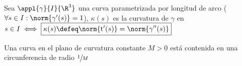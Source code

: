 \documentclass[12pt]{article}
\newcommand{\tngnt}{\operatorname{t}}
\begin{document}
\begin{defn}[Curvatura]
	Sea $\appl{\gamma}{I}{\R^3}$ una curva parametrizada por longitud de arco ($\forall s \in I : \norm{\gamma'(s)}=1$), $\kappa(s)$ es la curvatura de $\gamma$ en $s \in I \iff \boxed{\kappa(s) \defeq \norm{\tngnt'(s)}=\norm{\gamma''(s)}}$
\end{defn}

\begin{ejem}
	
\end{ejem}

\begin{prop}
	Una curva en el plano de curvatura constante $M > 0$ está contenida en una circunferencia de radio $\sfrac{1}{M}$
\end{prop}
\end{document}
